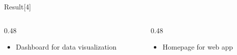 \begin{frame}{Result[4]}
    \begin{columns}[t, onlytextwidth]
        \begin{column}{0.48\textwidth}
            \begin{center}
            \end{center}
            \begin{itemize}
                \item Dashboard for data visualization
            \end{itemize}
        \end{column}
        \begin{column}{0.48\textwidth}
            \begin{center}
            \end{center}
            \begin{itemize}
                \item Homepage for web app
            \end{itemize}
        \end{column}
    \end{columns}
\end{frame}

